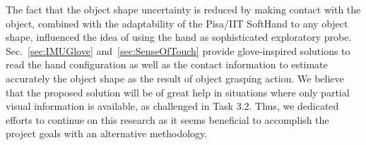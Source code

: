 \documentclass[a4paper,11pt,pdf]{pacmanreport}
\begin{document}

The fact that the object shape uncertainty is reduced by making contact with the object, combined with the adaptability of the Pisa/IIT SoftHand to any object shape, influenced the idea of using the hand as sophisticated exploratory probe. Sec.~\ref{sec:IMUGlove} and~\ref{sec:SenseOfTouch} provide glove-inspired solutions to read the hand configuration as well as the contact information to estimate accurately the object shape as the result of object grasping action. We believe that the proposed solution will be of great help in situations where only partial visual information is available, as challenged in Task 3.2. Thus, we dedicated efforts to continue on this research as it seems beneficial to accomplish the project goals with an alternative methodology.
\end{document}
